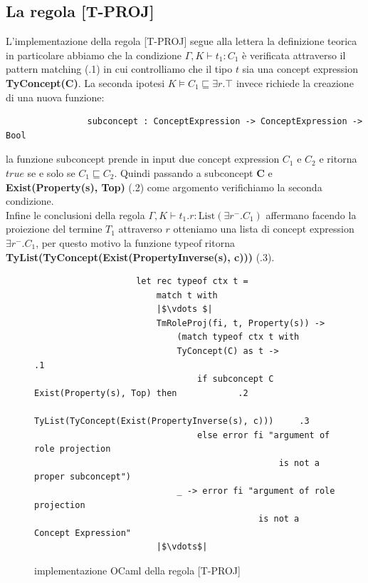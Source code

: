         \subsection{La regola [T-PROJ]}
            L'implementazione della regola [T-PROJ] segue alla lettera la definizione teorica in particolare abbiamo che la condizione $\Gamma,K \vdash t_1 : C_1$
            è verificata attraverso il pattern matching (.1) in cui controlliamo che il tipo $t$ sia una concept expression \textbf{TyConcept(C)}. La seconda ipotesi
            $K \vDash C_1 \sqsubseteq \exists r . \top$ invece richiede la creazione di una nuova funzione:
            \begin{verbatim}
                subconcept : ConceptExpression -> ConceptExpression -> Bool
            \end{verbatim}
            la funzione subconcept prende in input due concept expression $C_1$ e $C_2$ e ritorna $true$ se e solo se $C_1 \sqsubseteq C_2$. Quindi passando a subconcept
            \textbf{C} e \textbf{Exist(Property(s), Top)} (.2) come argomento verifichiamo la seconda condizione.
            \\Infine le conclusioni della regola $\Gamma,K \vdash t_1.r : \textrm{List}(\exists r^- . C_1)$ affermano facendo la proiezione del termine $T_1$ attraverso $r$
            otteniamo una lista di concept expression $\exists r^- . C_1$, per questo motivo la funzione typeof ritorna  \textbf{TyList(TyConcept(Exist(PropertyInverse(s), c)))} (.3).
            \begin{figure}[h] 
                \begin{verbatim}
                    let rec typeof ctx t =
                        match t with
                        |$\vdots $|
                        TmRoleProj(fi, t, Property(s)) ->
                            (match typeof ctx t with
                            TyConcept(C) as t ->                                        .1
                                if subconcept C Exist(Property(s), Top) then            .2
                                    TyList(TyConcept(Exist(PropertyInverse(s), c)))     .3
                                else error fi "argument of role projection 
                                                is not a proper subconcept")
                            _ -> error fi "argument of role projection 
                                            is not a Concept Expression"
                        |$\vdots$|
                \end{verbatim}
            \caption{implementazione OCaml della regola [T-PROJ]}
            \end{figure}

